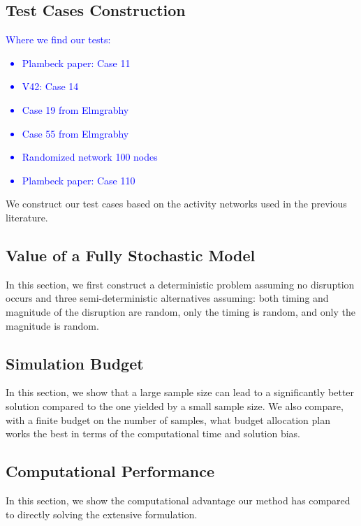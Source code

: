 \documentclass[11pt]{article}
\newcommand{\noi}{\noindent}
\begin{document}
	\subsection{Test Cases Construction} \label{subsec:example}
	\textcolor{blue}{Where we find our tests:
	\begin{itemize}
		\item Plambeck paper: Case 11
		\item V42: Case 14
		\item Case 19 from Elmgrabhy
		\item Case 55 from Elmgrabhy
		\item Randomized network 100 nodes
		\item Plambeck paper: Case 110
	\end{itemize}}
	\noi We construct our test cases based on the activity networks used in the previous literature.
	\subsection{Value of a Fully Stochastic Model} \label{subsec:value}
	In this section, we first construct a deterministic problem assuming no disruption occurs and three semi-deterministic alternatives assuming: both timing and magnitude of the disruption are random, only the timing is random, and only the magnitude is random.
	\subsection{Simulation Budget} \label{subsec:budget}
	In this section, we show that a large sample size can lead to a significantly better solution compared to the one yielded by a small sample size. We also compare, with a finite budget on the number of samples, what budget allocation plan works the best in terms of the computational time and solution bias.
	\subsection{Computational Performance} \label{subsec:time}
	In this section, we show the computational advantage our method has compared to directly solving the extensive formulation.


\end{document}

